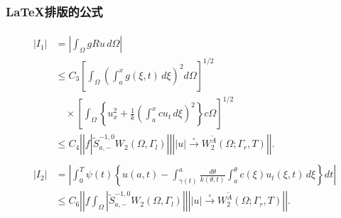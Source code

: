 \documentclass[compress]{beamer}
\begin{document}
\begin{frame}
\frametitle{\LaTeX{}排版的公式}
\small
\begin{align}
\begin{split}
|I_1| &= \left| \int_\Omega gRu \,d\Omega \right| \\
&\le C_3 \left[ \int_\Omega \left( \int_{a}^x
g(\xi,t) \,d \xi \right)^2d \Omega \right]^{1/2} \\
&\quad\times \left[ \int_\Omega \left\{ u^2_x + \frac{1}{k}
\left( \int_{a}^x cu_t \, d\xi \right)^2 \right\}
c \Omega \right]^{1/2} \\
&\le C_4 \left| \left| f \left| \widetilde{S}^{-1,0}_{a,-}
W_2(\Omega,\Gamma_l) \right| \right|
\left| |u| \overset{\circ} \to W_2^{\widetilde{A}}
(\Omega;\Gamma_r,T) \right| \right|.
\end{split}\label{eq:A} \\
\begin{split}
|I_2| &= \left| \int_{0}^T \psi(t) \left\{ u(a,t)
-\int_{\gamma(t)}^a \frac{d\theta}{k(\theta,t)}
\int_{a}^\theta c(\xi) u_t(\xi,t) \,d \xi \right\} dt
\right| \\
&\le C_6 \left| \left| f \int_\Omega
\left| \widetilde{S}^{-1,0}_{a,-}
W_2(\Omega,\Gamma_l) \right| \right|
\left| |u| \overset{\circ} \to W_2^{\widetilde{A}}
(\Omega;\Gamma_r,T) \right| \right|.
\end{split}
\end{align}

\end{frame}
\end{document}
